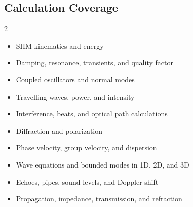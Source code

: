 \documentclass[10pt,a4paper,full]{physicsquiz}
\begin{document}
\hypersetup{pageanchor=false}
\makequiztitle
\hypersetup{pageanchor=true}

\begin{quizreferencecontent}
\section*{Calculation Coverage}
\begin{multicols}{2}
\begin{itemize}[leftmargin=*]
  \item SHM kinematics and energy
  \item Damping, resonance, transients, and quality factor
  \item Coupled oscillators and normal modes
  \item Travelling waves, power, and intensity
  \item Interference, beats, and optical path calculations
  \item Diffraction and polarization
  \item Phase velocity, group velocity, and dispersion
  \item Wave equations and bounded modes in 1D, 2D, and 3D
  \item Echoes, pipes, sound levels, and Doppler shift
  \item Propagation, impedance, transmission, and refraction
\end{itemize}
\end{multicols}
\end{quizreferencecontent}
\end{document}
